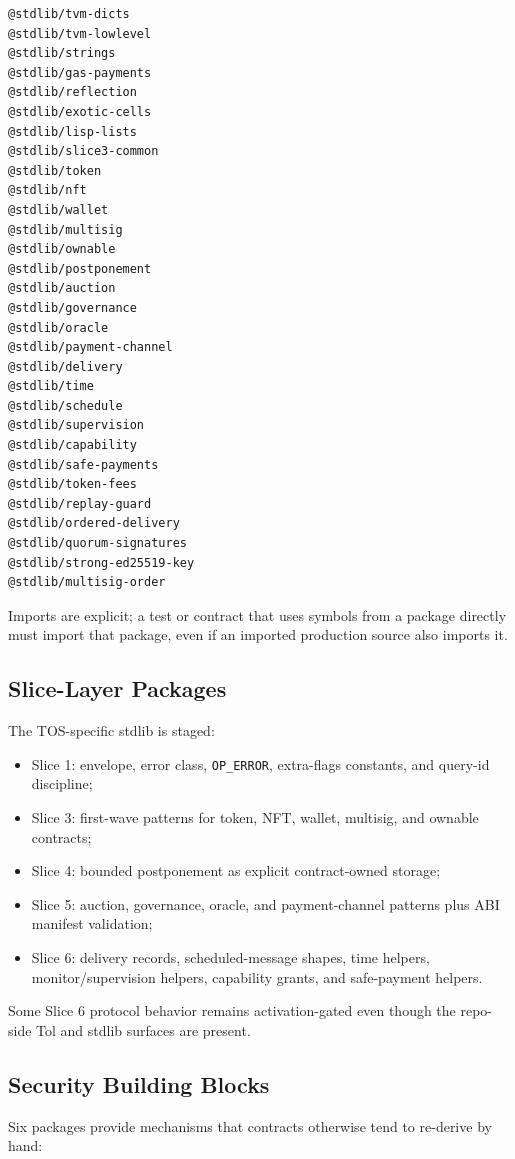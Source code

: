 \documentclass[12pt,oneside]{article}
\begin{document}
\begin{verbatim}
@stdlib/tvm-dicts
@stdlib/tvm-lowlevel
@stdlib/strings
@stdlib/gas-payments
@stdlib/reflection
@stdlib/exotic-cells
@stdlib/lisp-lists
@stdlib/slice3-common
@stdlib/token
@stdlib/nft
@stdlib/wallet
@stdlib/multisig
@stdlib/ownable
@stdlib/postponement
@stdlib/auction
@stdlib/governance
@stdlib/oracle
@stdlib/payment-channel
@stdlib/delivery
@stdlib/time
@stdlib/schedule
@stdlib/supervision
@stdlib/capability
@stdlib/safe-payments
@stdlib/token-fees
@stdlib/replay-guard
@stdlib/ordered-delivery
@stdlib/quorum-signatures
@stdlib/strong-ed25519-key
@stdlib/multisig-order
\end{verbatim}

Imports are explicit; a test or contract that uses symbols from a package
directly must import that package, even if an imported production source also
imports it.

\subsection{Slice-Layer Packages}
The TOS-specific stdlib is staged:

\begin{itemize}
\item Slice 1: envelope, error class, \verb|OP_ERROR|, extra-flags constants,
and query-id discipline;
\item Slice 3: first-wave patterns for token, NFT, wallet, multisig, and
ownable contracts;
\item Slice 4: bounded postponement as explicit contract-owned storage;
\item Slice 5: auction, governance, oracle, and payment-channel patterns plus
ABI manifest validation;
\item Slice 6: delivery records, scheduled-message shapes, time helpers,
monitor/supervision helpers, capability grants, and safe-payment helpers.
\end{itemize}

Some Slice 6 protocol behavior remains activation-gated even though the
repo-side Tol and stdlib surfaces are present.

\subsection{Security Building Blocks}
Six packages provide mechanisms that contracts otherwise tend to re-derive
by hand:
\end{document}
